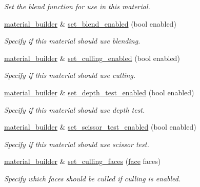 \begin{DoxyCompactItemize}
\begin{DoxyCompactList}\small\item\em Set the blend function for use in this material. \end{DoxyCompactList}\item 
\mbox{\hyperlink{classmoka_1_1material__builder}{material\+\_\+builder}} \& \mbox{\hyperlink{classmoka_1_1material__builder_a7a4c778d83008009bdb77e3b7306b8c1}{set\+\_\+blend\+\_\+enabled}} (bool enabled)
\begin{DoxyCompactList}\small\item\em Specify if this material should use blending. \end{DoxyCompactList}\item 
\mbox{\hyperlink{classmoka_1_1material__builder}{material\+\_\+builder}} \& \mbox{\hyperlink{classmoka_1_1material__builder_aa78682ff872e45859d862e6e31ba1caa}{set\+\_\+culling\+\_\+enabled}} (bool enabled)
\begin{DoxyCompactList}\small\item\em Specify if this material should use culling. \end{DoxyCompactList}\item 
\mbox{\hyperlink{classmoka_1_1material__builder}{material\+\_\+builder}} \& \mbox{\hyperlink{classmoka_1_1material__builder_ade5b3800ab919d3c842aa76f70fdf499}{set\+\_\+depth\+\_\+test\+\_\+enabled}} (bool enabled)
\begin{DoxyCompactList}\small\item\em Specify if this material should use depth test. \end{DoxyCompactList}\item 
\mbox{\hyperlink{classmoka_1_1material__builder}{material\+\_\+builder}} \& \mbox{\hyperlink{classmoka_1_1material__builder_ac69e714a4d4a2da70c057b5470ccf6cb}{set\+\_\+scissor\+\_\+test\+\_\+enabled}} (bool enabled)
\begin{DoxyCompactList}\small\item\em Specify if this material should use scissor test. \end{DoxyCompactList}\item 
\mbox{\hyperlink{classmoka_1_1material__builder}{material\+\_\+builder}} \& \mbox{\hyperlink{classmoka_1_1material__builder_afd585663a729d53924ec312fbbd8dfed}{set\+\_\+culling\+\_\+faces}} (\mbox{\hyperlink{namespacemoka_a262acd665924ba4041f64f7207b17cbe}{face}} faces)
\begin{DoxyCompactList}\small\item\em Specify which faces should be culled if culling is enabled. \end{DoxyCompactList}\item 

\end{DoxyCompactItemize}
